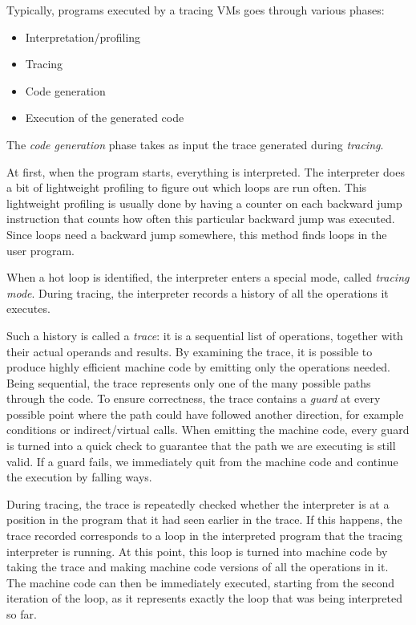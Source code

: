 \documentclass{acm_proc_article-sp}
\begin{document}
Typically, programs executed by a tracing VMs goes through various phases:

\begin{itemize}
\item Interpretation/profiling
\item Tracing
\item Code generation
\item Execution of the generated code
\end{itemize}

The \emph{code generation} phase takes as input the trace generated during
\emph{tracing}.

At first, when the program starts, everything is interpreted.
The interpreter does a bit of lightweight profiling to figure out which loops
are run often. This lightweight profiling is usually done by having a counter on
each backward jump instruction that counts how often this particular backward jump
was executed. Since loops need a backward jump somewhere, this method finds
loops in the user program.

When a hot loop is identified, the interpreter enters a
special mode, called \emph{tracing mode}. During tracing, the interpreter
records a history of all the operations it executes.

Such a history is called a \emph{trace}: it is a sequential list of
operations, together with their actual operands and results.  By examining the
trace, it is possible to produce highly efficient machine code by emitting
only the operations needed.  Being sequential, the trace represents only one
of the many possible paths through the code. To ensure correctness, the trace
contains a \emph{guard} at every possible point where the path could have
followed another direction, for example conditions or indirect/virtual
calls.  When emitting the machine code, every guard is turned into a quick check
to guarantee that the path we are executing is still valid.  If a guard fails,
we immediately quit from the machine code and continue the execution by falling
ways.  

During tracing, the trace is repeatedly
checked whether the interpreter is at a position in the program that it had seen
earlier in the trace. If this happens, the trace recorded corresponds to a loop
in the interpreted program that the tracing interpreter is running. At this point, this loop
is turned into machine code by taking the trace and making machine code versions
of all the operations in it. The machine code can then be immediately executed,
starting from the second iteration of the loop,
as it represents exactly the loop that was being interpreted so far.
\end{document}
